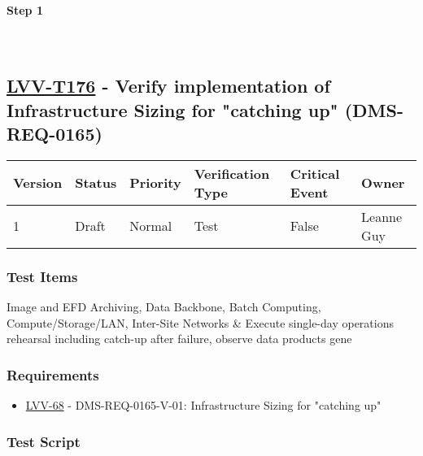 \textbf{Step 1}\\
~\\
~\\

\hypertarget{lvv-t176---verify-implementation-of-infrastructure-sizing-for-catching-up-dms-req-0165}{%
\subsection{\texorpdfstring{\href{https://jira.lsstcorp.org/secure/Tests.jspa\#/testCase/LVV-T176}{LVV-T176}
- Verify implementation of Infrastructure Sizing for "catching up"
(DMS-REQ-0165)}{LVV-T176 - Verify implementation of Infrastructure Sizing for "catching up" (DMS-REQ-0165)}}\label{lvv-t176---verify-implementation-of-infrastructure-sizing-for-catching-up-dms-req-0165}}

\begin{longtable}[]{@{}llllll@{}}
\toprule
Version & Status & Priority & Verification Type & Critical Event &
Owner\tabularnewline
\midrule
\endhead
1 & Draft & Normal & Test & False & Leanne Guy\tabularnewline
\bottomrule
\end{longtable}

\hypertarget{test-items-76}{%
\subsubsection{Test Items}\label{test-items-76}}

Image and EFD Archiving, Data Backbone, Batch Computing,
Compute/Storage/LAN, Inter-Site Networks \& Execute single-day
operations rehearsal including catch-up after failure, observe data
products gene

\hypertarget{requirements-76}{%
\subsubsection{Requirements}\label{requirements-76}}

\begin{itemize}
\tightlist
\item
  \href{https://jira.lsstcorp.org/browse/LVV-68}{LVV-68} -
  DMS-REQ-0165-V-01: Infrastructure Sizing for "catching up"
\end{itemize}

\hypertarget{test-script-76}{%
\subsubsection{Test Script}\label{test-script-76}}

